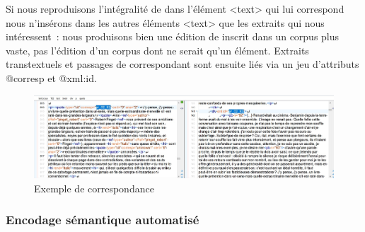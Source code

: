 \documentclass[12pt, a4paper]{article}
\begin{document}
Si nous reproduisons l'intégralité de \punr{} dans l'élément <text> qui lui correspond nous n'insérons dans les autres éléments <text> que les extraits qui nous intéressent~: nous produisons bien une édition de \punr{} inscrit dans un corpus plus vaste, pas l'édition d'un corpus dont \punr{} ne serait qu'un élément. Extraits transtextuels et passages de \punr{} correspondant sont ensuite liés via un jeu d'attributs @corresp et @xml\NoAutoSpaceBeforeFDP:id.
\begin{figure}[H]
    \centering
    \includegraphics[scale=0.3]{img/screen_corresp.jpg}
    \caption{Exemple de correspondance}
    \label{fig:screen_corresp}
\end{figure}
\subsubsection{Encodage sémantique automatisé}
\end{document}
